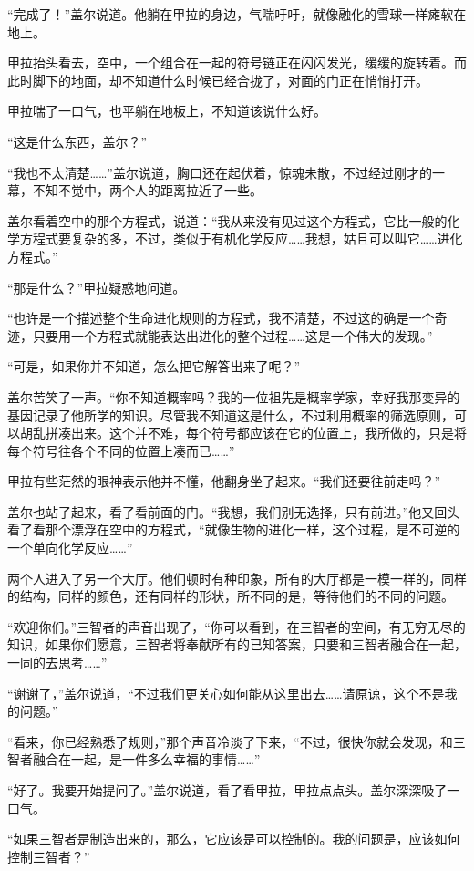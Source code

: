 “完成了！”盖尔说道。他躺在甲拉的身边，气喘吁吁，就像融化的雪球一样瘫软在地上。 

甲拉抬头看去，空中，一个组合在一起的符号链正在闪闪发光，缓缓的旋转着。而此时脚下的地面，却不知道什么时候已经合拢了，对面的门正在悄悄打开。 

甲拉喘了一口气，也平躺在地板上，不知道该说什么好。 

“这是什么东西，盖尔？” 

“我也不太清楚……”盖尔说道，胸口还在起伏着，惊魂未散，不过经过刚才的一幕，不知不觉中，两个人的距离拉近了一些。 

盖尔看着空中的那个方程式，说道：“我从来没有见过这个方程式，它比一般的化学方程式要复杂的多，不过，类似于有机化学反应……我想，姑且可以叫它……进化方程式。” 

“那是什么？”甲拉疑惑地问道。 

“也许是一个描述整个生命进化规则的方程式，我不清楚，不过这的确是一个奇迹，只要用一个方程式就能表达出进化的整个过程……这是一个伟大的发现。” 

“可是，如果你并不知道，怎么把它解答出来了呢？” 

盖尔苦笑了一声。“你不知道概率吗？我的一位祖先是概率学家，幸好我那变异的基因记录了他所学的知识。尽管我不知道这是什么，不过利用概率的筛选原则，可以胡乱拼凑出来。这个并不难，每个符号都应该在它的位置上，我所做的，只是将每个符号往各个不同的位置上凑而已……” 

甲拉有些茫然的眼神表示他并不懂，他翻身坐了起来。“我们还要往前走吗？” 

盖尔也站了起来，看了看前面的门。“我想，我们别无选择，只有前进。”他又回头看了看那个漂浮在空中的方程式，“就像生物的进化一样，这个过程，是不可逆的一个单向化学反应……” 

两个人进入了另一个大厅。他们顿时有种印象，所有的大厅都是一模一样的，同样的结构，同样的颜色，还有同样的形状，所不同的是，等待他们的不同的问题。 

“欢迎你们。”三智者的声音出现了，“你可以看到，在三智者的空间，有无穷无尽的知识，如果你们愿意，三智者将奉献所有的已知答案，只要和三智者融合在一起，一同的去思考……” 

“谢谢了，”盖尔说道，“不过我们更关心如何能从这里出去……请原谅，这个不是我的问题。” 

“看来，你已经熟悉了规则，”那个声音冷淡了下来，“不过，很快你就会发现，和三智者融合在一起，是一件多么幸福的事情……” 

“好了。我要开始提问了。”盖尔说道，看了看甲拉，甲拉点点头。盖尔深深吸了一口气。 

“如果三智者是制造出来的，那么，它应该是可以控制的。我的问题是，应该如何控制三智者？” 

